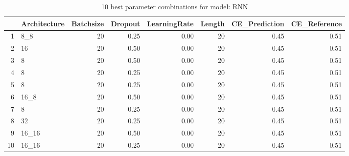 \begin{table}[ht]
\centering
\begin{tabular}{rlrrrrrr}
  \hline
 & Architecture & Batchsize & Dropout & LearningRate & Length & CE\_Prediction & CE\_Reference \\ 
  \hline
1 & 8\_8 &  20 & 0.25 & 0.00 &  20 & 0.45 & 0.51 \\ 
  2 & 16 &  20 & 0.50 & 0.00 &  20 & 0.45 & 0.51 \\ 
  3 & 8 &  20 & 0.50 & 0.00 &  20 & 0.45 & 0.51 \\ 
  4 & 8 &  20 & 0.25 & 0.00 &  20 & 0.45 & 0.51 \\ 
  5 & 8 &  20 & 0.25 & 0.00 &  20 & 0.45 & 0.51 \\ 
  6 & 16\_8 &  20 & 0.50 & 0.00 &  20 & 0.45 & 0.51 \\ 
  7 & 8 &  20 & 0.25 & 0.00 &  20 & 0.45 & 0.51 \\ 
  8 & 32 &  20 & 0.25 & 0.00 &  20 & 0.45 & 0.51 \\ 
  9 & 16\_16 &  20 & 0.50 & 0.00 &  20 & 0.45 & 0.51 \\ 
  10 & 16\_16 &  20 & 0.25 & 0.00 &  20 & 0.45 & 0.51 \\ 
   \hline
\end{tabular}
\caption{10 best parameter combinations for model: RNN} 
\label{tab:RNN_top_10}
\end{table}
